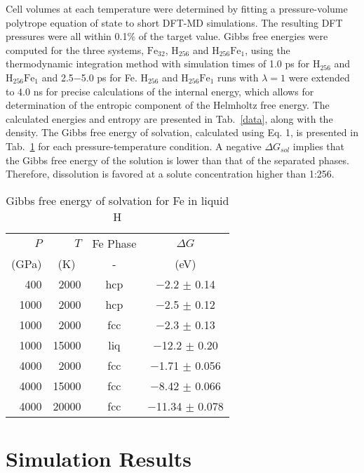 Cell volumes at each temperature were determined by fitting a pressure-volume
polytrope equation of state to short DFT-MD simulations. The resulting DFT
pressures were all within 0.1\% of the target value. Gibbs free energies were
computed for the three systems, $\mathrm{Fe}_{32}$, $\mathrm{H}_{256}$ and
$\mathrm{H}_{256}\mathrm{Fe}_1$, using the thermodynamic integration method
with simulation times of 1.0 ps for $\mathrm{H}_{256}$ and
$\mathrm{H}_{256}\mathrm{Fe}_1$ and 2.5$-$5.0 ps for Fe. $\mathrm{H}_{256}$ and
$\mathrm{H}_{256}\mathrm{Fe}_1$ runs with $\lambda =1$ were extended to 4.0 ns
for precise calculations of the internal energy, which allows for determination
of the entropic component of the Helmholtz free energy. The calculated energies
and entropy are presented in Tab.~\ref{data}, along with the density.  The Gibbs free
energy of solvation, calculated using Eq. 1, is presented in Tab.~\ref{solvation} for each
pressure-temperature condition. A negative $\Delta G_{sol}$ implies that the
Gibbs free energy of the solution is lower than that of the separated phases.
Therefore, dissolution is favored at a solute concentration higher than 1:256. 

\begin{table}[!h]
    \centering
\caption{Gibbs free energy of solvation for Fe in liquid H\label{solvation}}
\begin{tabular}{rrcc}
    \hline
{$P$} & {$T$} &  {Fe Phase} & {$\Delta G$} \\
(GPa) & (K)~ & - & (eV) \\
\hline
400 \phantom{0}  & 2000  & hcp  &  $-$2.2 $\pm$ 0.14    \\
1000\phantom{0}  & 2000  & hcp  &  $-$2.5 $\pm$ 0.12    \\
1000\phantom{0}  & 2000  & fcc  &  $-$2.3 $\pm$ 0.13    \\
1000\phantom{0}  & 15000 & liq  &  $-$12.2 $\pm$ 0.20\phantom{0}   \\
4000\phantom{0}  & 2000  & fcc  &  $-$1.71 $\pm$ 0.056  \\
4000\phantom{0}  & 15000 & fcc  &  $-$8.42 $\pm$ 0.066  \\
4000\phantom{0} & 20000 & fcc  &  $-$11.34 $\pm$ 0.078\phantom{0} \\
\hline
\end{tabular}
\end{table}


\section{Simulation Results}

